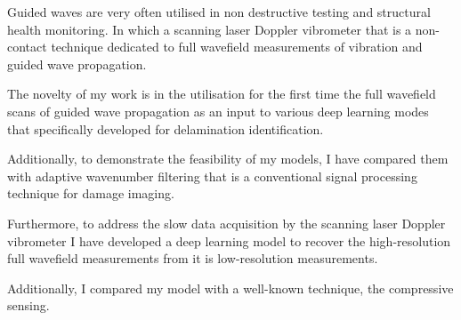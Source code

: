 \documentclass[10pt,aspectratio=169,dvipsnames]{beamer} %
\begin{document}
	\note
	{
		Guided waves are very often utilised in non destructive testing and structural health monitoring.
		In which a scanning laser Doppler vibrometer that is a non-contact technique dedicated to full wavefield measurements of vibration and guided wave propagation. 
				
		The novelty of my work is in the utilisation for the first time the full wavefield scans of guided wave propagation as an input to various deep learning modes that specifically developed for delamination identification. 
		
		Additionally, to demonstrate the feasibility of my models, I have compared them with adaptive wavenumber filtering that is a conventional signal processing technique for damage imaging.
		
		Furthermore, to address the slow data acquisition by the scanning laser Doppler vibrometer I have developed a deep learning model to recover the high-resolution full wavefield measurements from it is low-resolution measurements.
		
		Additionally, I compared my model with a well-known technique, the compressive sensing.		
	}
\end{document}
